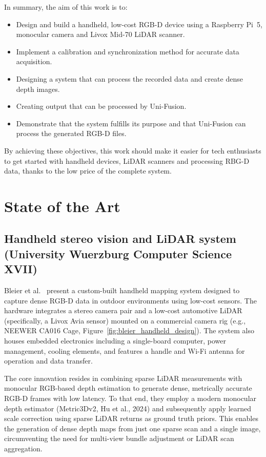 \documentclass[english, bachelor, utf8]{base/thesis_telematics}
\begin{document}
In summary, the aim of this work is to:
\begin{itemize}
    \item Design and build a handheld, low-cost RGB-D device using a Raspberry Pi~5, monocular camera and
    Livox Mid-70 LiDAR scanner.
    \item Implement a calibration and synchronization method for accurate data acquisition.
    \item Designing a system that can process the recorded data and create dense depth images.
    \item Creating output that can be processed by Uni-Fusion.
    \item Demonstrate that the system fulfills its purpose and that Uni-Fusion can process the generated RGB-D files.
\end{itemize}

By achieving these objectives, this work should make it easier for tech enthusiasts to get started with handheld devices, LiDAR scanners
and processing RBG-D data, thanks to the low price of the complete system.

\chapter{State of the Art}

\section*{Handheld stereo vision and LiDAR system (University Wuerzburg Computer Science XVII)}
Bleier et al.~\cite{bleier2024} present a custom-built handheld mapping system designed to 
capture dense RGB-D data in outdoor environments using low-cost sensors. The hardware integrates 
a stereo camera pair and a low-cost automotive LiDAR (specifically, a Livox Avia sensor) mounted on a 
commercial camera rig (e.g., NEEWER CA016 Cage, Figure~\ref{fig:bleier_handheld_design}). The system 
also houses embedded electronics including a single-board computer, power management, cooling 
elements, and features a handle and Wi-Fi antenna for operation and data transfer.

The core innovation resides in combining sparse LiDAR measurements with monocular RGB-based depth 
estimation to generate dense, metrically accurate RGB-D frames with low latency. To that end, they 
employ a modern monocular depth estimator (Metric3Dv2, Hu et al., 2024) and subsequently apply learned 
scale correction using sparse LiDAR returns as ground truth priors. This enables the generation of 
dense depth maps from just one sparse scan and a single image, circumventing the need for multi-view 
bundle adjustment or LiDAR scan aggregation.
\end{document}
